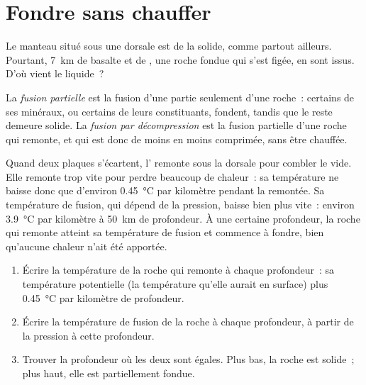 \section{Fondre sans chauffer}

Le manteau situé sous une dorsale est de la  solide, comme
partout ailleurs. Pourtant, \qty{7}{km} de basalte et de , une roche
fondue qui s'est figée, en sont issus. D'où vient le liquide~?

\begin{definition}\label{def:g11:ocean-ridges:partial-melting}
La \emph{fusion partielle} est la fusion d'une
partie seulement d'une roche~: certains de ses minéraux, ou certains de
leurs constituants, fondent, tandis que le reste demeure solide. La
\emph{fusion par décompression}
est la fusion partielle d'une roche qui remonte, et qui est
donc de moins en moins comprimée, sans être chauffée.
\end{definition}

Quand deux plaques s'écartent, l' remonte sous la dorsale pour
combler le vide. Elle remonte trop vite pour perdre beaucoup de chaleur~:
sa température ne baisse donc que d'environ \qty{0.45}{\celsius} par
kilomètre pendant la remontée. Sa température de fusion, qui dépend de la
pression, baisse bien plus vite~: environ \qty{3.9}{\celsius} par kilomètre
à \qty{50}{km} de profondeur. À une certaine profondeur, la roche qui
remonte atteint sa température de fusion et commence à fondre, bien
qu'aucune chaleur n'ait été apportée.

\begin{method}\label{met:g11:ocean-ridges:melting}
\begin{enumerate}
  \item Écrire la température de la roche qui remonte à chaque
        profondeur~: sa température potentielle (la température qu'elle
        aurait en surface) plus \qty{0.45}{\celsius} par kilomètre de
        profondeur.
  \item Écrire la température de fusion de la roche à chaque profondeur, à
        partir de la pression à cette profondeur.
  \item Trouver la profondeur où les deux sont égales. Plus bas, la roche
        est solide~; plus haut, elle est partiellement fondue.
\end{enumerate}
\end{method}

